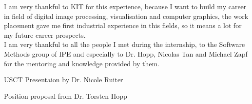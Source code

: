 \documentclass[english]{article}
\begin{document}
I am very thankful to KIT for this experience, because I want to build my career in field of digital image processing, visualisation and computer graphics, the work placement gave me first industrial experience in this fields, so it means a lot for my future career prospects.\\

I am very thankful to all the people I met during the internship, to the Software Methods group of IPE and especially to Dr. Hopp, Nicolas Tan and Michael Zapf for the mentoring and knowledge provided by them.

\newpage
\begin{thebibliography}{1}

    USCT Presentaion by Dr. Nicole Ruiter
   
    Position proposal from Dr. Torsten Hopp

\end{thebibliography}
\end{document}

